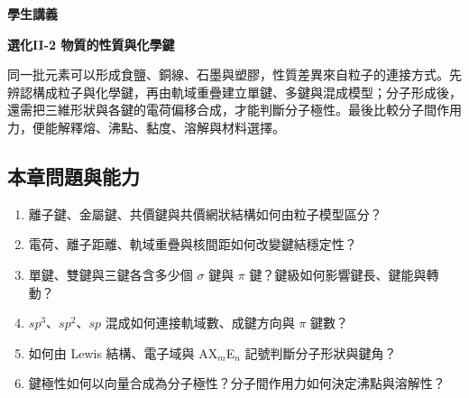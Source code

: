 \documentclass[11pt,a4paper]{article}
\providecommand{\tightlist}{%
  \setlength{\itemsep}{0pt}\setlength{\parskip}{0pt}}
\begin{document}
\begin{tcolorbox}[
  enhanced,colback=white,colframe=HandoutBlue,boxrule=1.1pt,arc=2mm,
  borderline west={3pt}{0pt}{HandoutBlue},left=5mm,right=4mm,top=4mm,bottom=4mm
]
{\sffamily\small\bfseries\color{HandoutBlue}學生講義}\par
{\sffamily\bfseries\LARGE\color{HandoutInk}選化II-2 物質的性質與化學鍵}\par
\vspace{0.35em}{\large 由粒子之間的吸引、軌域重疊、分子形狀與電荷分布，推得材料性質、分子極性與沸點}\par
{}\par
{}\par
\end{tcolorbox}


同一批元素可以形成食鹽、銅線、石墨與塑膠，性質差異來自粒子的連接方式。先辨認構成粒子與化學鍵，再由軌域重疊建立單鍵、多鍵與混成模型；分子形成後，還需把三維形狀與各鍵的電荷偏移合成，才能判斷分子極性。最後比較分子間作用力，便能解釋熔、沸點、黏度、溶解與材料選擇。

\begin{HandoutLearningMap}

\subsection{本章問題與能力}\label{ux672cux7ae0ux554fux984cux8207ux80fdux529b}

\begin{enumerate}
\def\labelenumi{\arabic{enumi}.}
\tightlist
\item
  離子鍵、金屬鍵、共價鍵與共價網狀結構如何由粒子模型區分？
\item
  電荷、離子距離、軌域重疊與核間距如何改變鍵結穩定性？
\item
  單鍵、雙鍵與三鍵各含多少個 \(\sigma\) 鍵與 \(\pi\) 鍵？鍵級如何影響鍵長、鍵能與轉動？
\item
  \(sp^3\)、\(sp^2\)、\(sp\) 混成如何連接軌域數、成鍵方向與 \(\pi\) 鍵數？
\item
  如何由 Lewis 結構、電子域與 AX\(_m\)E\(_n\) 記號判斷分子形狀與鍵角？
\item
  鍵極性如何以向量合成為分子極性？分子間作用力如何決定沸點與溶解性？
\end{enumerate}

\end{HandoutLearningMap}
\end{document}
